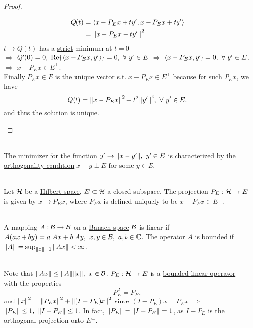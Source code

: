 \begin{proof}
\begin{itemize}
    \begin{align*}
        Q(t) &= \left\langle x - P_E x + ty', x - P_E x + t y' \right\rangle \\&= \norm{x - P_E x + ty'}^2
    \end{align*}
    $t \to Q(t)$ has a \underline{strict} minimum at $t = 0$\\ 
    $\Rightarrow$ $Q'(0) = 0,\ \Re{\inprod{x - P_E x}{y'}} = 0,\ \forall\ y' \in E$ $\Rightarrow$ $\left\langle x - P_E x, y' \right\rangle = 0,\ \forall\ y' \in E$.\\
    $\Rightarrow$ $x - P_E x \in E^\perp$.\\
    Finally $P_E x \in E$ is the unique vector s.t. $x - P_E x \in E^\perp$ because for such $P_E x$, we have 
    \begin{equation*}
        Q(t) = \norm{x - P_E x}^2 + t^2 \norm{y'}^2,\ \forall\ y' \in E.
    \end{equation*}
    and thus the solution is unique.
\end{itemize}
\end{proof}
\begin{remark}\ \\
    The minimizer for the function $y' \to \norm{x - y'},\ y' \in E$ is characterized by the \underline{orthogonality condition} $x - y \perp E$ for some $y \in E$.
\end{remark}

\vspace{3pt}
\begin{definition}\ \\
Let $\mathcal{H}$ be a \underline{Hilbert space}, $E \subset \mathcal{H}$ a closed subspace. The projection $P_E: \mathcal{H} \to E$ is given by $x \to P_E x$, where $P_E x$ is defined uniquely to be $x - P_E x \in E^\perp$. 
\end{definition}

\vspace{3pt}
\begin{definition}\ \\
A mapping $A: \mathcal{B} \to \mathcal{B}$ on a \underline{Banach space} $\mathcal{B}$ is linear if $A(ax + by) = a\ Ax + b\ Ay,\ x,y \in \Bs,\ a,b \in \C$. The operator $A$ is \underline{bounded} if $\norm{A} = \sup_{\norm{x} = 1} \norm{Ax} < \infty$.
\end{definition}
\begin{remark}\ \\
    Note that $\norm{Ax} \leq \norm{A} \norm{x},\ x \in \Bs$. $P_E: \mathcal{H} \to E$  is a \underline{bounded linear operator} with the properties 
    \begin{equation*}
        P^2_E = P_E,
    \end{equation*}
    and $\norm{x}^2 = \norm{P_E x}^2 + \norm{(I - P_E) x}^2$ since $(I - P_E)x \perp P_E x$ $\Rightarrow$ $\norm{P_E} \leq 1,\ \norm{I - P_E} \leq 1$. In fact, $\norm{P_E} = \norm{I - P_E} = 1$, as $I - P_E$ is the orthogonal projection onto $E^\perp$.
\end{remark}

